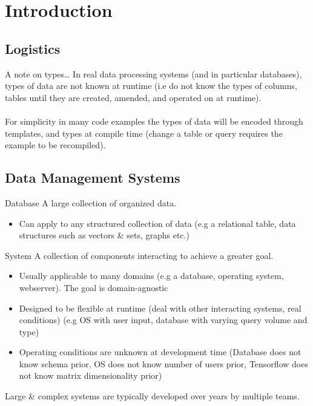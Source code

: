 \chapter{Introduction}
\section{Logistics}

\begin{sidenotebox}{A note on types\dots}
    In real data processing systems (and in particular databases), types of data are not known at runtime (i.e do not know the types of columns, tables until they are created, amended, and operated on at runtime). 
    \\
    \\ For simplicity in many code examples the types of data will be encoded through templates, and types at compile time (change a table or query requires the example to be recompiled).
\end{sidenotebox}

\section{Data Management Systems}
\begin{definitionbox}{Database}
    A large collection of organized data.
    \begin{itemize}
        \item Can apply to any structured collection of data (e.g a relational table, data structures such as vectors \& sets, graphs etc.)
    \end{itemize}
\end{definitionbox}

\begin{definitionbox}{System}
    A collection of components interacting to achieve a greater goal.
    \begin{itemize}
        \item Usually applicable to many domains (e.g a database, operating system, webserver). The goal is domain-agnostic
        \item Designed to be flexible at runtime (deal with other interacting systems, real conditions) (e.g OS with user input, database with varying query volume and type)
        \item Operating conditions are unknown at development time (Database does not know schema prior, OS does not know number of users prior, Tensorflow does not know matrix dimensionality prior)
    \end{itemize}
    Large \& complex systems are typically developed over years by multiple teams.
\end{definitionbox}

